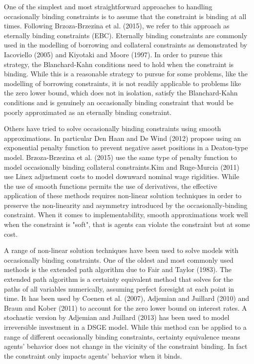 \documentclass[cn,10pt,math=newtx,citestyle=gb7714-2015,bibstyle=gb7714-2015]{elegantbook}
\begin{document}
One of the simplest and most straightforward approaches to handling occasionally binding constraints is to assume that the constraint is binding at all times. Following Brzoza-Brzezina et al. (2015), we refer to this approach as eternally binding constraints (EBC). Eternally binding constraints are commonly used in the modelling of borrowing and collateral constraints as demonstrated by Iacoviello (2005) and Kiyotaki and Moore (1997). In order to pursue this strategy, the Blanchard-Kahn conditions need to hold when the constraint is binding. While this is a reasonable strategy to pursue for some problems, like the modelling of borrowing constraints, it is not readily applicable to problems like the zero lower bound, which does not in isolation, satisfy the Blanchard-Kahn conditions and is genuinely an occasionally binding constraint that would be poorly approximated as an eternally binding constraint.

Others have tried to solve occasionally binding constraints using smooth approximations. In particular Den Haan and De Wind (2012) propose using an exponential penalty function to prevent negative asset positions in a Deaton-type model. Brzoza-Brzezina et al. (2015) use the same type of penalty function to model occasionally binding collateral constraints.Kim and Ruge-Murcia (2011) use Linex adjustment costs to model downward nominal wage rigidities. While the use of smooth functions permits the use of derivatives, the effective application of these methods requires non-linear solution techniques in order to preserve the non-linearity and asymmetry introduced by the occasionally-binding constraint. When it comes to implementability, smooth approximations work well when the constraint is "soft", that is agents can violate the constraint but at some cost.

A range of non-linear solution techniques have been used to solve models with occasionally binding constraints. One of the oldest and most commonly used methods is the extended path algorithm due to Fair and Taylor (1983). The extended path algorithm is a certainty equivalent
method that solves for the paths of all variables numerically, assuming perfect foresight at each point in time. It has been used by Coenen et al. (2007), Adjemian and Juillard (2010) and Braun and Kober (2011) to account for the zero lower bound on interest rates. A stochastic
version by Adjemian and Juillard (2013) has been used to model irreversible investment in a DSGE model. While this method can be applied to a range of different occasionally binding constraints, certainty equivalence means agents' behavior does not change in the vicinity of
the constraint binding. In fact the constraint only impacts agents' behavior when it binds.
\end{document}
